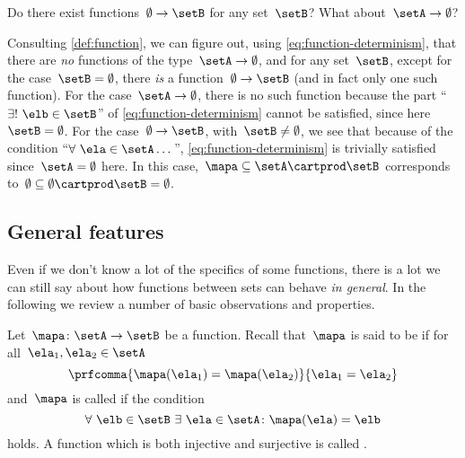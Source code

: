 Do there exist functions~$\emptyset \to \setB$ for any set~$\setB$?
What about~$\setA \to \emptyset$?

Consulting \cref{def:function}, we can figure out, using \cref{eq:function-determinism}, that there are \emph{no} functions of the type~$\setA \to \emptyset$, and for any set~$\setB$, except for the case~$\setB = \emptyset$, there \emph{is} a function~$\emptyset \to \setB$ (and in fact only one such function).
For the case~$\setA \to \emptyset$, there is no such function because the part ``$\exists !
    \ \elb \in \setB$'' of \cref{eq:function-determinism} cannot be satisfied, since here~$\setB = \emptyset$.
For the case~$\emptyset \to \setB$, with~$\setB \neq \emptyset$, we see that because of the condition ``$\forall \ \ela \in \setA \dots$'', \cref{eq:function-determinism} is trivially satisfied since~$\setA = \emptyset$ here.
In this case,~$\mapa \subseteq \setA \cartprod \setB$ corresponds to~$\emptyset \subseteq \emptyset \cartprod \setB = \emptyset$.

\subsection{General features}

Even if we don't know a lot of the specifics of some functions, there is a lot we can still say about how functions between sets can behave \emph{in general}.
In the following we review a number of basic observations and properties.

Let~$\mapa\colon \setA \to \setB$ be a function.
Recall that~$\mapa$ is said to be \emph{} if for all~$\ela_1, \ela_2 \in \setA$
\begin{equation}
    \label{eq:injectivity-cond}
    \prfcomma{\mapa(\ela_1) = \mapa(\ela_2)}{\ela_1 = \ela_2}
\end{equation}
and~$\mapa$ is called \emph{} if the condition
\begin{equation}
    \label{eq:surjectivity-cond}
    \forall \ \elb \in \setB \ \exists \ \ela \in \setA \colon \mapa(\ela) = \elb
\end{equation}
holds.
A function which is both injective and surjective is called \emph{}.

